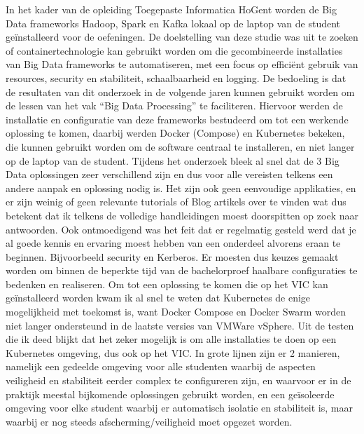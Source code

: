 In het kader van de opleiding Toegepaste Informatica HoGent worden de Big Data frameworks Hadoop, Spark en Kafka lokaal op de laptop van de student geïnstalleerd voor de oefeningen.
De doelstelling van deze studie was uit te zoeken of containertechnologie kan gebruikt worden om die gecombineerde installaties van Big Data frameworks te automatiseren, met een focus op efficiënt gebruik van resources, security en stabiliteit, schaalbaarheid en logging. De bedoeling is dat de resultaten van dit onderzoek in de volgende jaren kunnen gebruikt worden om de lessen van het vak ``Big Data Processing'' te faciliteren.
\newline
\newline
Hiervoor werden de installatie en configuratie van deze frameworks bestudeerd om tot een werkende oplossing te komen, daarbij werden Docker (Compose) en Kubernetes bekeken, die kunnen gebruikt worden om de software centraal te installeren, en niet langer op de laptop van de student.
\newline
\newline
Tijdens het onderzoek bleek al snel dat de 3 Big Data oplossingen zeer verschillend zijn en dus voor alle vereisten telkens een andere aanpak en oplossing nodig is.
Het zijn ook geen eenvoudige applikaties, en er zijn weinig of geen relevante tutorials of Blog artikels over te vinden wat dus betekent dat ik telkens de volledige handleidingen moest doorspitten op zoek naar antwoorden. Ook ontmoedigend was het feit dat er regelmatig gesteld werd dat je al goede kennis en ervaring moest hebben van een onderdeel alvorens eraan te beginnen. Bijvoorbeeld security en Kerberos.
\newline
Er moesten dus keuzes gemaakt worden om binnen de beperkte tijd van de bachelorproef haalbare configuraties te bedenken en realiseren.
\newline
\newline
Om tot een oplossing te komen die op het VIC kan geïnstalleerd worden kwam ik al snel te weten dat Kubernetes de enige mogelijkheid met toekomst is, want Docker Compose en Docker Swarm worden niet langer ondersteund in de laatste versies van VMWare vSphere.
\newline
\newline
Uit de testen die ik deed blijkt dat het zeker mogelijk is om alle installaties te doen op een Kubernetes omgeving, dus ook op het VIC. In grote lijnen zijn er 2 manieren, namelijk een gedeelde omgeving voor alle studenten waarbij de aspecten veiligheid en stabiliteit eerder complex te configureren zijn, en waarvoor er in de praktijk meestal bijkomende oplossingen gebruikt worden, en een geïsoleerde omgeving voor elke student waarbij er automatisch isolatie en stabiliteit is, maar waarbij er nog steeds afscherming/veiligheid moet opgezet worden.
